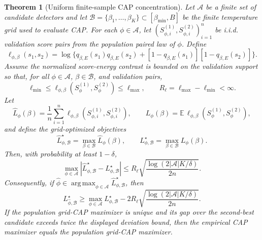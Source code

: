 \documentclass[11pt]{article}
\newtheorem{theorem}{Theorem}
\newcommand{\E}{\mathbb{E}}
\newcommand{\argmax}{\operatorname*{arg\,max}}
\begin{document}
\begin{theorem}[Uniform finite-sample CAP concentration]
\label{thm:finite-sample-cap}
Let \(\mathcal A\) be a finite set of candidate detectors and let
\(\mathcal B=\{\beta_1,\ldots,\beta_K\}\subset[\beta_{\min},B]\) be the finite
temperature grid used to evaluate CAP. For each \(\phi\in\mathcal A\), let
\((S_{\phi,i}^{(1)},S_{\phi,i}^{(2)})_{i=1}^n\) be i.i.d. validation score
pairs from the population paired law of \(\phi\). Define
\[
\ell_{\phi,\beta}(s_1,s_2)
=
\log\{q_{\beta,E}(s_1)q_{\beta,E}(s_2)
+[1-q_{\beta,E}(s_1)][1-q_{\beta,E}(s_2)]\}.
\]
Assume the normalized score-energy contrast is bounded on the validation
support so that, for all \(\phi\in\mathcal A\), \(\beta\in\mathcal B\), and
validation pairs,
\[
    \ell_{\min}\le \ell_{\phi,\beta}(S_\phi^{(1)},S_\phi^{(2)})
    \le \ell_{\max},
    \qquad
    R_\ell=\ell_{\max}-\ell_{\min}<\infty .
\]
Let
\[
    \widehat L_\phi(\beta)
    =
    \frac1n\sum_{i=1}^n
    \ell_{\phi,\beta}(S_{\phi,i}^{(1)},S_{\phi,i}^{(2)}),
    \qquad
    L_\phi(\beta)=\E\,\ell_{\phi,\beta}(S_\phi^{(1)},S_\phi^{(2)}),
\]
and define the grid-optimized objectives
\[
    \widehat L_{\phi,\mathcal B}^{\star}
    =
    \max_{\beta\in\mathcal B}\widehat L_\phi(\beta),
    \qquad
    L_{\phi,\mathcal B}^{\star}
    =
    \max_{\beta\in\mathcal B}L_\phi(\beta).
\]
Then, with probability at least \(1-\delta\),
\[
    \max_{\phi\in\mathcal A}
    \left|
        \widehat L_{\phi,\mathcal B}^{\star}
        -
        L_{\phi,\mathcal B}^{\star}
    \right|
    \le
    R_\ell
    \sqrt{
        \frac{\log(2|\mathcal A|K/\delta)}{2n}
    }.
\]
Consequently, if
\(\widehat\phi\in\argmax_{\phi\in\mathcal A}
\widehat L_{\phi,\mathcal B}^{\star}\), then
\[
    L_{\widehat\phi,\mathcal B}^{\star}
    \ge
    \max_{\phi\in\mathcal A}L_{\phi,\mathcal B}^{\star}
    -
    2R_\ell
    \sqrt{
        \frac{\log(2|\mathcal A|K/\delta)}{2n}
    }.
\]
If the population grid-CAP maximizer is unique and its gap over the
second-best candidate exceeds twice the displayed deviation bound, then the
empirical CAP maximizer equals the population grid-CAP maximizer.
\end{theorem}
\end{document}
